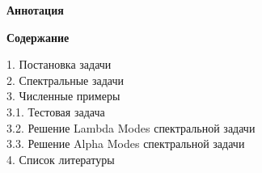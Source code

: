 {	\setcounter{page}{2}	
	\cleardoublepage

	\begin{center}
	\begin{Large}
		\textbf{Аннотация} 	
	\end{Large}
	\end{center}

	\theabstract

	\vfill
	\pagebreak
	\begin{center}
	\begin{Large}
	\textbf{Содержание}	
	\end{Large}
	\end{center}
	\vspace{10mm}
	1. Постановка задачи  \\	
	2. Спектральные задачи  \\	
	3. Численные примеры  \\
	\phantom{123}  3.1. Тестовая задача  \\
	\phantom{123} 3.2. Решение Lambda Modes спектральной задачи  \\
	\phantom{123} 3.3. Решение Alpha Modes спектральной задачи  \\
	4. Список литературы 
			
	\vfill	
}

 
\usepackage{tikz}
\usetikzlibrary{er}
\usetikzlibrary{shapes,arrows}